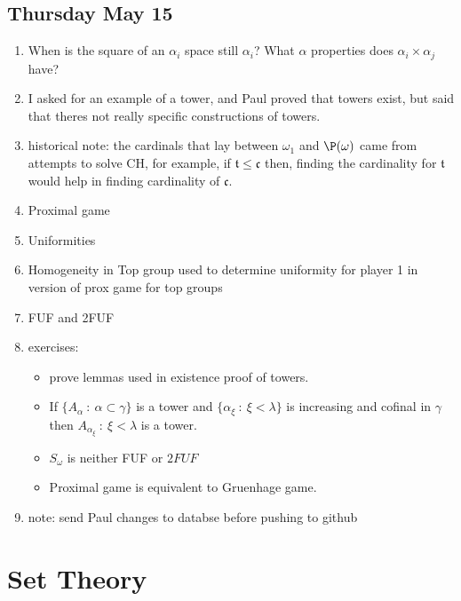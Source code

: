 \documentclass{article}
\begin{document}
\subsection*{Thursday May 15}
\begin{enumerate}
    \item When is the square of an \(\alpha_i\) space still \(\alpha_i\)? What \(\alpha\) properties does \(\alpha_i \times \alpha_j\) have?
    \item I asked for an example of a tower, and Paul proved that towers exist, but said that theres not really specific constructions of towers.
    \item historical note: the cardinals that lay between \(\omega_1\) and \(\P(\omega)\) came from attempts to solve CH, for example, if \(\mathfrak{t} \leq \mathfrak{c}\) then, finding the cardinality for \(\mathfrak{t}\) would help in finding cardinality of \(\mathfrak{c}\).
    \item Proximal game
    \item Uniformities
    \item Homogeneity in Top group used to determine uniformity for player 1 in version of prox game for top groups
    \item FUF and 2FUF
    \item exercises:
    \begin{itemize}
        \item prove lemmas used in existence proof of towers.
        \item If \(\{A_{\alpha} \: : \: \alpha \subset \gamma \}\) is a tower and \(\{\alpha_{\xi} \: : \: \xi < \lambda\}\) is increasing and cofinal in \(\gamma\) then \(A_{\alpha_\xi} \: : \: \xi < \lambda\) is a tower.
        \item \(S_{\omega}\) is neither FUF or \(2FUF\) \checkmark
        \item Proximal game is equivalent to Gruenhage game.
    \end{itemize}
    \item note: send Paul changes to databse before pushing to github
\end{enumerate}

\section{Set Theory}
\end{document}
